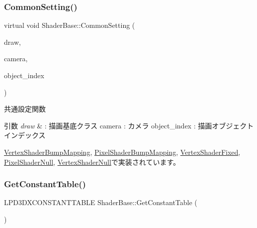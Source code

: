 \subsubsection{\texorpdfstring{Common\+Setting()}{CommonSetting()}}
{\footnotesize\ttfamily virtual void Shader\+Base\+::\+Common\+Setting (\begin{DoxyParamCaption}\item[{\mbox{\hyperlink{class_draw_base}{Draw\+Base}} $\ast$}]{draw,  }\item[{\mbox{\hyperlink{class_camera}{Camera}} $\ast$}]{camera,  }\item[{unsigned}]{object\+\_\+index }\end{DoxyParamCaption})\hspace{0.3cm}{\ttfamily [pure virtual]}}



共通設定関数 


\begin{DoxyParams}{引数}
{\em draw} & \+: 描画基底クラス camera \+: カメラ object\+\_\+index \+: 描画オブジェクトインデックス \\
\hline
\end{DoxyParams}


\mbox{\hyperlink{class_vertex_shader_bump_mapping_a7979584d035fff86d386c99617a8dd2c}{Vertex\+Shader\+Bump\+Mapping}}, \mbox{\hyperlink{class_pixel_shader_bump_mapping_af62a2b40930533a3bae17319f876705d}{Pixel\+Shader\+Bump\+Mapping}}, \mbox{\hyperlink{class_vertex_shader_fixed_a82bf2829b6fd0df26faedcbf650ba08d}{Vertex\+Shader\+Fixed}}, \mbox{\hyperlink{class_pixel_shader_null_a99c712ab174da29ba26a893820b64799}{Pixel\+Shader\+Null}}, \mbox{\hyperlink{class_vertex_shader_null_a95f1a66045fb39c42cf0566f1990b6a1}{Vertex\+Shader\+Null}}で実装されています。

\mbox{\label{class_shader_base_a85a5c17b56b6ffa29f7784ab42696d7c}} 
\subsubsection{\texorpdfstring{Get\+Constant\+Table()}{GetConstantTable()}}
{\footnotesize\ttfamily L\+P\+D3\+D\+X\+C\+O\+N\+S\+T\+A\+N\+T\+T\+A\+B\+LE Shader\+Base\+::\+Get\+Constant\+Table (\begin{DoxyParamCaption}{ }\end{DoxyParamCaption})\hspace{0.3cm}{\ttfamily [inline]}}




